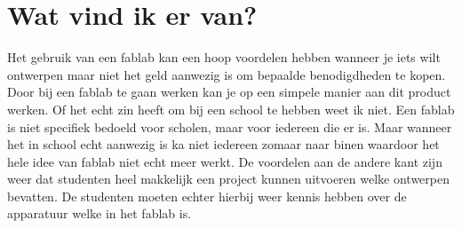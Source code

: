 \section{Wat vind ik er van?}
Het gebruik van een fablab kan een hoop voordelen hebben wanneer je iets wilt ontwerpen maar niet het geld aanwezig is om bepaalde benodigdheden te kopen. Door bij een fablab te gaan werken kan je op een simpele manier aan dit product werken.
Of het echt zin heeft om bij een school te hebben weet ik niet. Een fablab is niet specifiek bedoeld voor scholen, maar voor iedereen die er is. Maar wanneer het in school echt aanwezig is ka niet iedereen zomaar naar binen waardoor het hele idee van fablab niet echt meer werkt.
De voordelen aan de andere kant zijn weer dat studenten heel makkelijk een project kunnen uitvoeren welke ontwerpen bevatten. De studenten moeten echter hierbij weer kennis hebben over de apparatuur welke in het fablab is.
